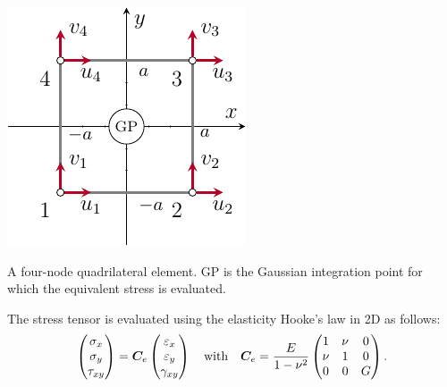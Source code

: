 \begin{marginfigure}
    \centering
    \includegraphics{figures/03_comparison_TO_TTO/02_gauss_point/gp.pdf}
    \caption{A four-node quadrilateral element. GP is the Gaussian integration point for which the equivalent stress is evaluated.}
    \label{fig:03_gp}
\end{marginfigure}


The stress tensor is evaluated using the elasticity Hooke's law in 2D as follows: 
\begin{equation}
    \begin{pmatrix}
    \sigma_x \\
    \sigma_y \\
    \tau_{xy}
    \end{pmatrix}
    =\bm{C}_e
    \begin{pmatrix}
    \varepsilon_x \\
    \varepsilon_y \\
    \gamma_{xy}
    \end{pmatrix}
    \quad
    \text{with}
    \quad
    \bm{C}_e = \frac{E}{1-\nu^2}
    \begin{pmatrix}
    1   &   \nu &   0   \\
    \nu &   1   &   0   \\
    0   &   0   &   G
    \end{pmatrix}.
\end{equation}

